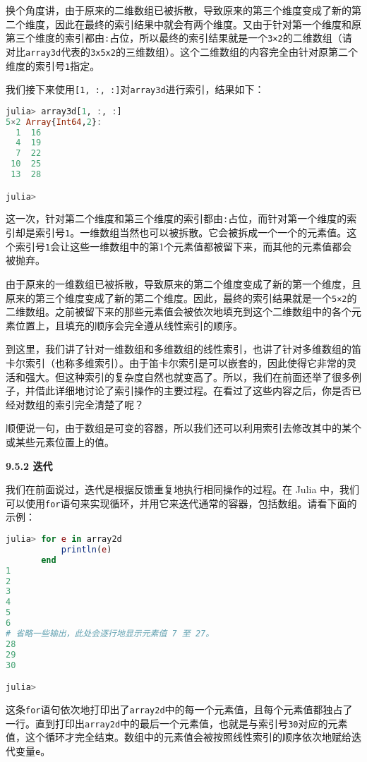 换个角度讲，由于原来的二维数组已被拆散，导致原来的第三个维度变成了新的第二个维度，因此在最终的索引结果中就会有两个维度。又由于针对第一个维度和原第三个维度的索引都由\verb`:`占位，所以最终的索引结果就是一个\verb`3×2`的二维数组（请对比\verb`array3d`代表的\verb`3x5x2`的三维数组）。这个二维数组的内容完全由针对原第二个维度的索引号\verb`1`指定。

我们接下来使用\verb`[1, :, :]`对\verb`array3d`进行索引，结果如下：

\begin{lstlisting}[language=julia]
julia> array3d[1, :, :]
5×2 Array{Int64,2}:
  1  16
  4  19
  7  22
 10  25
 13  28

julia> 
\end{lstlisting}

这一次，针对第二个维度和第三个维度的索引都由\verb`:`占位，而针对第一个维度的索引却是索引号\verb`1`。一维数组当然也可以被拆散。它会被拆成一个一个的元素值。这个索引号\verb`1`会让这些一维数组中的第1个元素值都被留下来，而其他的元素值都会被抛弃。

由于原来的一维数组已被拆散，导致原来的第二个维度变成了新的第一个维度，且原来的第三个维度变成了新的第二个维度。因此，最终的索引结果就是一个\verb`5×2`的二维数组。之前被留下来的那些元素值会被依次地填充到这个二维数组中的各个元素位置上，且填充的顺序会完全遵从线性索引的顺序。

到这里，我们讲了针对一维数组和多维数组的线性索引，也讲了针对多维数组的笛卡尔索引（也称多维索引）。由于笛卡尔索引是可以嵌套的，因此使得它非常的灵活和强大。但这种索引的复杂度自然也就变高了。所以，我们在前面还举了很多例子，并借此详细地讨论了索引操作的主要过程。在看过了这些内容之后，你是否已经对数组的索引完全清楚了呢？

顺便说一句，由于数组是可变的容器，所以我们还可以利用索引去修改其中的某个或某些元素位置上的值。

\textbf{9.5.2 迭代}

我们在前面说过，迭代是根据反馈重复地执行相同操作的过程。在 Julia 中，我们可以使用\verb`for`语句来实现循环，并用它来迭代通常的容器，包括数组。请看下面的示例：

\begin{lstlisting}[language=julia]
julia> for e in array2d
           println(e)
       end
1
2
3
4
5
6
# 省略一些输出，此处会逐行地显示元素值 7 至 27。
28
29
30

julia> 
\end{lstlisting}

这条\verb`for`语句依次地打印出了\verb`array2d`中的每一个元素值，且每个元素值都独占了一行。直到打印出\verb`array2d`中的最后一个元素值，也就是与索引号\verb`30`对应的元素值，这个循环才完全结束。数组中的元素值会被按照线性索引的顺序依次地赋给迭代变量\verb`e`。

